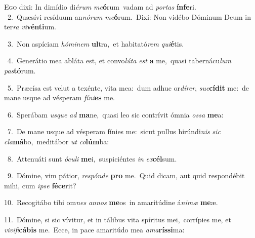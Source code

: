\lettrine{\initial\textcolor{\initialcolor}{E}}{go} dixi: In dimídio di\-\textit{é}\-\textit{rum} \textit{me}\-\textbf{ó}rum~\star vadam ad \textit{por}\-\textit{tas} \textbf{ín}\-\textbf{fe}ri.\\
{\numbfont\textcolor{\numbcolor}{~2.}}~Quæsívi resíduum an\-\textit{nó}\-\textit{rum} \textit{me}\-\textbf{ó}rum.~\star Dixi: Non vidébo Dóminum Deum in ter\textit{ra} \textit{vi}\-\textbf{vén}\textbf{ti}um.\par
{\numbfont\textcolor{\numbcolor}{~3.}}~Non aspíciam \textit{hó}\-\textit{mi}\textit{nem} \textbf{ul}\-tra,~\star et habitató\textit{rem} \textit{qui}\-\textbf{é}tis.\par
{\numbfont\textcolor{\numbcolor}{~4.}}~Generátio mea abláta est, et convo\-\textit{lú}\-\textit{ta} \textit{est} \textbf{a} me,~\star quasi tabernácu\textit{lum} \textit{pas}\-\textbf{tó}rum.\par
{\numbfont\textcolor{\numbcolor}{~5.}}~Præcísa est velut a texénte, vita mea:~\dagger dum adhuc or\-\textit{dí}\-\textit{rer}, \textit{suc}\-\textbf{cí}\textbf{dit} me:~\star de mane usque ad vésperam \textit{fí}\-\textit{ni}\textbf{es} me.\par
{\numbfont\textcolor{\numbcolor}{~6.}}~Sperábam \textit{us}\-\textit{que} \textit{ad} \textbf{ma}\-ne,~\star quasi leo sic contrívit ómnia \textit{os}\-\textit{sa} \textbf{me}\-a:\par
{\numbfont\textcolor{\numbcolor}{~7.}}~De mane usque ad vésperam fínies me:~\dagger sicut pullus hirúndi\textit{nis} \textit{sic} \textit{cla}\-\textbf{má}bo,~\star meditábor \textit{ut} \textit{co}\-\textbf{lúm}ba:\par
{\numbfont\textcolor{\numbcolor}{~8.}}~Attenuáti sunt \textit{ó}\-\textit{cu}\textit{li} \textbf{me}\-i,~\star suspiciéntes \textit{in} \textit{ex}\-\textbf{cél}sum.\par
{\numbfont\textcolor{\numbcolor}{~9.}}~Dómine, vim pátior, \textit{re}\-\textit{spón}\textit{de} \textbf{pro} me.~\star Quid dicam, aut quid respondébit mihi, cum \textit{ip}\-\textit{se} \textbf{fé}\-\textbf{ce}rit?\par
{\numbfont\textcolor{\numbcolor}{10.}}~Recogitábo tibi om\textit{nes} \textit{an}\-\textit{nos} \textbf{me}\-os~\star in amaritúdine á\-\textit{ni}\-\textit{mæ} \textbf{me}\-æ.\par
{\numbfont\textcolor{\numbcolor}{11.}}~Dómine, si sic vívitur, et in tálibus vita spíritus mei,~\dagger corrípies me, et \textit{vi}\-\textit{vi}\textit{fi}\textbf{cá}\textbf{bis} me.~\star Ecce, in pace amaritúdo mea \textit{a}\-\textit{ma}\textbf{rís}\textbf{si}ma:\par
